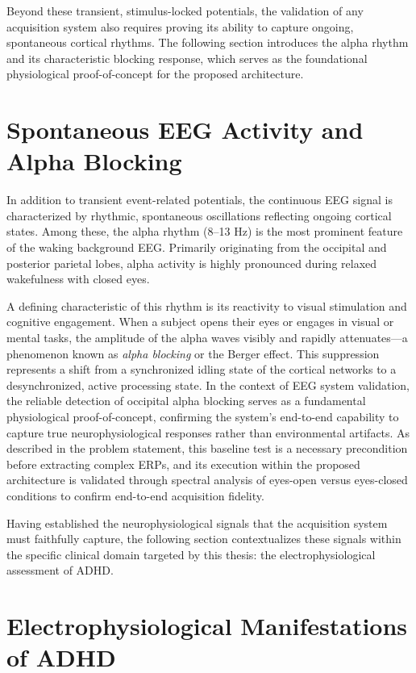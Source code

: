 Beyond these transient, stimulus-locked potentials, the validation of any acquisition system also requires proving its ability to capture ongoing, spontaneous cortical rhythms. The following section introduces the alpha rhythm and its characteristic blocking response, which serves as the foundational physiological proof-of-concept for the proposed architecture.

\section{Spontaneous EEG Activity and Alpha Blocking}
\label{sec:alpha_blocking}

In addition to transient event-related potentials, the continuous EEG signal is characterized by rhythmic, spontaneous oscillations reflecting ongoing cortical states. Among these, the alpha rhythm (8--13 Hz) is the most prominent feature of the waking background EEG. Primarily originating from the occipital and posterior parietal lobes, alpha activity is highly pronounced during relaxed wakefulness with closed eyes.

A defining characteristic of this rhythm is its reactivity to visual stimulation and cognitive engagement. When a subject opens their eyes or engages in visual or mental tasks, the amplitude of the alpha waves visibly and rapidly attenuates---a phenomenon known as \textit{alpha blocking} or the Berger effect. This suppression represents a shift from a synchronized idling state of the cortical networks to a desynchronized, active processing state. In the context of EEG system validation, the reliable detection of occipital alpha blocking serves as a fundamental physiological proof-of-concept, confirming the system's end-to-end capability to capture true neurophysiological responses rather than environmental artifacts. As described in the problem statement, this baseline test is a necessary precondition before extracting complex ERPs, and its execution within the proposed architecture is validated through spectral analysis of eyes-open versus eyes-closed conditions to confirm end-to-end acquisition fidelity.

Having established the neurophysiological signals that the acquisition system must faithfully capture, the following section contextualizes these signals within the specific clinical domain targeted by this thesis: the electrophysiological assessment of ADHD.

\section{Electrophysiological Manifestations of ADHD}
\label{sec:adhd_manifestations}

